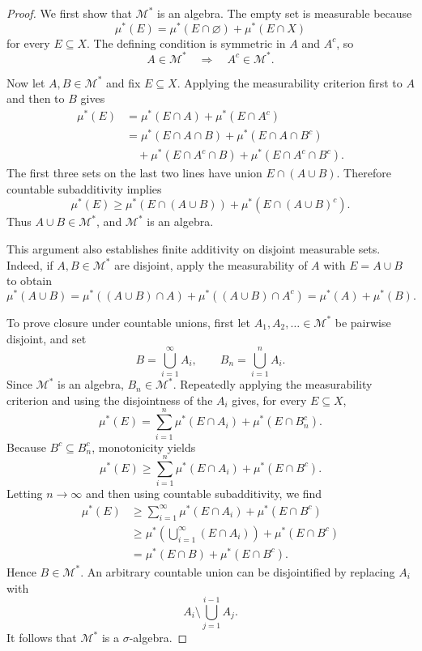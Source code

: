 \begin{proof}
  We first show that $\mathcal M^*$ is an algebra. The empty set is
  measurable because
  \[
    \mu^*(E)=\mu^*(E\cap\varnothing)+\mu^*(E\cap X)
  \]
  for every $E\subseteq X$. The defining condition is symmetric in $A$
  and $A^c$, so
  \[
    A\in\mathcal M^*\quad\Longrightarrow\quad A^c\in\mathcal M^*.
  \]

  Now let $A,B\in\mathcal M^*$ and fix $E\subseteq X$. Applying the
  measurability criterion first to $A$ and then to $B$ gives
  \begin{align*}
    \mu^*(E)
    &=\mu^*(E\cap A)+\mu^*(E\cap A^c)\\
    &=\mu^*(E\cap A\cap B)+\mu^*(E\cap A\cap B^c)\\
    &\quad+\mu^*(E\cap A^c\cap B)
      +\mu^*(E\cap A^c\cap B^c).
  \end{align*}
  The first three sets on the last two lines have union
  $E\cap(A\cup B)$. Therefore countable subadditivity implies
  \[
    \mu^*(E)
    \geq\mu^*(E\cap(A\cup B))
      +\mu^*(E\cap(A\cup B)^c).
  \]
  Thus $A\cup B\in\mathcal M^*$, and $\mathcal M^*$ is an algebra.

  This argument also establishes finite additivity on disjoint
  measurable sets. Indeed, if $A,B\in\mathcal M^*$ are disjoint, apply
  the measurability of $A$ with $E=A\cup B$ to obtain
  \[
    \mu^*(A\cup B)
    =\mu^*((A\cup B)\cap A)
      +\mu^*((A\cup B)\cap A^c)
    =\mu^*(A)+\mu^*(B).
  \]

  To prove closure under countable unions, first let
  $A_1,A_2,\ldots\in\mathcal M^*$ be pairwise disjoint, and set
  \[
    B=\bigcup_{i=1}^{\infty}A_i,
    \qquad
    B_n=\bigcup_{i=1}^nA_i.
  \]
  Since $\mathcal M^*$ is an algebra, $B_n\in\mathcal M^*$. Repeatedly
  applying the measurability criterion and using the disjointness of the
  $A_i$ gives, for every $E\subseteq X$,
  \[
    \mu^*(E)
    =\sum_{i=1}^n\mu^*(E\cap A_i)+\mu^*(E\cap B_n^c).
  \]
  Because $B^c\subseteq B_n^c$, monotonicity yields
  \[
    \mu^*(E)
    \geq\sum_{i=1}^n\mu^*(E\cap A_i)+\mu^*(E\cap B^c).
  \]
  Letting $n\to\infty$ and then using countable subadditivity, we find
  \begin{align*}
    \mu^*(E)
    &\geq\sum_{i=1}^{\infty}\mu^*(E\cap A_i)
      +\mu^*(E\cap B^c)\\
    &\geq\mu^*\left(\bigcup_{i=1}^{\infty}(E\cap A_i)\right)
      +\mu^*(E\cap B^c)\\
    &=\mu^*(E\cap B)+\mu^*(E\cap B^c).
  \end{align*}
  Hence $B\in\mathcal M^*$. An arbitrary countable union can be
  disjointified by replacing $A_i$ with
  \[
    A_i\setminus\bigcup_{j=1}^{i-1}A_j.
  \]
  It follows that $\mathcal M^*$ is a $\sigma$-algebra.


\end{proof}
